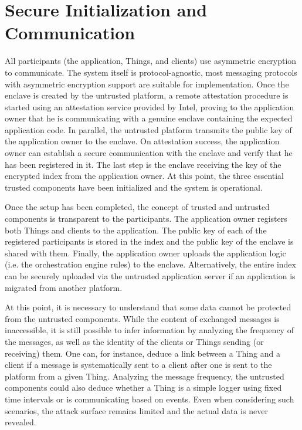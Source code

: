 \documentclass{sigchi}
\begin{document}

\section{Secure Initialization and Communication}

All participants (the application, Things, and clients) use asymmetric encryption to communicate. The system itself is protocol-agnostic, most messaging protocols with asymmetric encryption support are suitable for implementation. Once the enclave is created by the untrusted platform, a remote attestation procedure is started using an attestation service provided by Intel, proving to the application owner that he is communicating with a genuine enclave containing the expected application code. In parallel, the untrusted platform transmits the public key of the application owner to the enclave. On attestation success, the application owner can establish a secure communication with the enclave and verify that he has been registered in it. The last step is the enclave receiving the key of the encrypted index from the application owner. At this point, the three essential trusted components have been initialized and the system is operational.

Once the setup has been completed, the concept of trusted and untrusted components is transparent to the participants. The application owner registers both Things and clients to the application. The public key of each of the registered participants is stored in the index and the public key of the enclave is shared with them. Finally, the application owner uploads the application logic (i.e. the orchestration engine rules) to the enclave. Alternatively, the entire index can be securely uploaded via the untrusted application server if an application is migrated from another platform. 

At this point, it is necessary to understand that some data cannot be protected from the untrusted components. While the content of exchanged messages is inaccessible, it is still possible to infer information by analyzing the frequency of the messages, as well as the identity of the clients or Things sending (or receiving) them. One can, for instance, deduce a link between a Thing and a client if a message is systematically sent to a client after one is sent to the platform from a given Thing. Analyzing the message frequency, the untrusted components could also deduce whether a Thing is a simple logger using fixed time intervals or is communicating based on events. Even when considering such scenarios, the attack surface remains limited and the actual data is never revealed.
\end{document}
